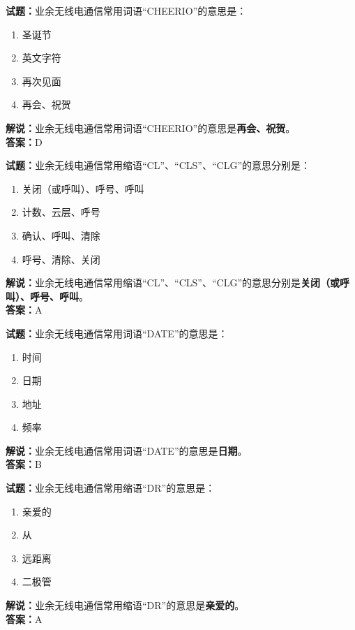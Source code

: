 \documentclass{ctexbook}
\begin{document}
\noindent\textbf{试题：}业余无线电通信常用词语“CHEERIO”的意思是：
\begin{enumerate}[leftmargin=3em]
\item 圣诞节
\item 英文字符
\item 再次见面
\item 再会、祝贺
\end{enumerate}
\noindent\textbf{解说：}业余无线电通信常用词语“CHEERIO”的意思是\textbf{再会、祝贺}。\\\noindent\textbf{答案：}D



\bigskip


\noindent\textbf{试题：}业余无线电通信常用缩语“CL”、“CLS”、“CLG”的意思分别是：
\begin{enumerate}[leftmargin=3em]
\item 关闭（或呼叫）、呼号、呼叫
\item 计数、云层、呼号
\item 确认、呼叫、清除
\item 呼号、清除、关闭
\end{enumerate}
\noindent\textbf{解说：}业余无线电通信常用缩语“CL”、“CLS”、“CLG”的意思分别是\textbf{关闭（或呼叫）、呼号、呼叫}。\\\noindent\textbf{答案：}A

\bigskip


\noindent\textbf{试题：}业余无线电通信常用词语“DATE”的意思是：
\begin{enumerate}[leftmargin=3em]
\item 时间
\item 日期
\item 地址
\item 频率
\end{enumerate}
\noindent\textbf{解说：}业余无线电通信常用词语“DATE”的意思是\textbf{日期}。\\\noindent\textbf{答案：}B

\bigskip


\noindent\textbf{试题：}业余无线电通信常用缩语“DR”的意思是：
\begin{enumerate}[leftmargin=3em]
\item 亲爱的
\item 从
\item 远距离
\item 二极管
\end{enumerate}
\noindent\textbf{解说：}业余无线电通信常用缩语“DR”的意思是\textbf{亲爱的}。\\\noindent\textbf{答案：}A
\end{document}
